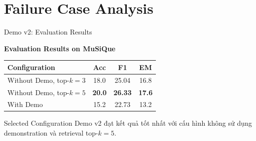 

\section{Failure Case Analysis}

\begin{frame}{Demo v2: Evaluation Results}

\small

\textbf{Evaluation Results on MuSiQue}

\vspace{0.2cm}

\centering
\begin{tabular}{lccc}
    \hline
    \textbf{Configuration} & \textbf{Acc} & \textbf{F1} & \textbf{EM} \\
    \hline
    Without Demo, top-$k=3$ & 18.0 & 25.04 & 16.8 \\
    Without Demo, top-$k=5$ & \textbf{20.0} & \textbf{26.33} & \textbf{17.6} \\
    With Demo & 15.2 & 22.73 & 13.2 \\
    \hline
\end{tabular}

\vspace{0.3cm}

\begin{block}{Selected Configuration}
    \small
    Demo v2 đạt kết quả tốt nhất với cấu hình không sử dụng
    demonstration và retrieval top-$k=5$.
\end{block}

\end{frame}


